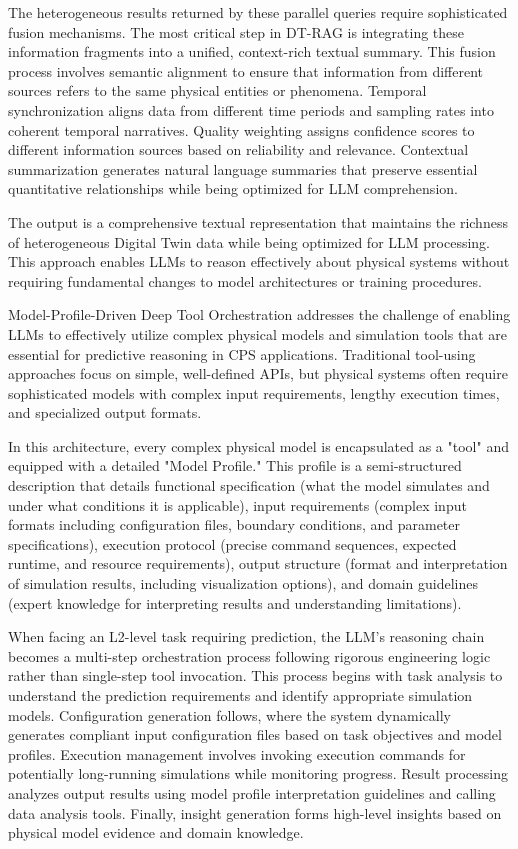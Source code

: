 The heterogeneous results returned by these parallel queries require sophisticated fusion mechanisms. The most critical step in DT-RAG is integrating these information fragments into a unified, context-rich textual summary. This fusion process involves semantic alignment to ensure that information from different sources refers to the same physical entities or phenomena. Temporal synchronization aligns data from different time periods and sampling rates into coherent temporal narratives. Quality weighting assigns confidence scores to different information sources based on reliability and relevance. Contextual summarization generates natural language summaries that preserve essential quantitative relationships while being optimized for LLM comprehension.

The output is a comprehensive textual representation that maintains the richness of heterogeneous Digital Twin data while being optimized for LLM processing. This approach enables LLMs to reason effectively about physical systems without requiring fundamental changes to model architectures or training procedures.

Model-Profile-Driven Deep Tool Orchestration addresses the challenge of enabling LLMs to effectively utilize complex physical models and simulation tools that are essential for predictive reasoning in CPS applications. Traditional tool-using approaches focus on simple, well-defined APIs, but physical systems often require sophisticated models with complex input requirements, lengthy execution times, and specialized output formats.

In this architecture, every complex physical model is encapsulated as a "tool" and equipped with a detailed "Model Profile." This profile is a semi-structured description that details functional specification (what the model simulates and under what conditions it is applicable), input requirements (complex input formats including configuration files, boundary conditions, and parameter specifications), execution protocol (precise command sequences, expected runtime, and resource requirements), output structure (format and interpretation of simulation results, including visualization options), and domain guidelines (expert knowledge for interpreting results and understanding limitations).

When facing an L2-level task requiring prediction, the LLM's reasoning chain becomes a multi-step orchestration process following rigorous engineering logic rather than single-step tool invocation. This process begins with task analysis to understand the prediction requirements and identify appropriate simulation models. Configuration generation follows, where the system dynamically generates compliant input configuration files based on task objectives and model profiles. Execution management involves invoking execution commands for potentially long-running simulations while monitoring progress. Result processing analyzes output results using model profile interpretation guidelines and calling data analysis tools. Finally, insight generation forms high-level insights based on physical model evidence and domain knowledge.

